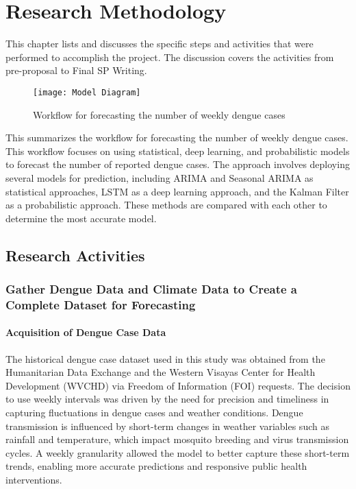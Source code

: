 \chapter{Research Methodology}
This chapter lists and discusses the specific steps and activities that  were  performed  to accomplish the project. 
The discussion covers the activities from pre-proposal to Final SP Writing.

\begin{figure}[ht]
	\centering
	\texttt{[image: Model Diagram]}
	\caption{Workflow for forecasting the number of weekly dengue cases}
	\label{fig:data_snippet}
\end{figure}
This summarizes the workflow for forecasting the number of weekly dengue cases. This workflow focuses on using statistical, deep learning, and probabilistic models to forecast the number of reported dengue cases. The approach involves deploying several models for prediction, including ARIMA and Seasonal ARIMA as statistical approaches, LSTM as a deep learning approach, and the Kalman Filter as a probabilistic approach. These methods are compared with each other to determine the most accurate model.
\section{Research Activities}

\subsection{Gather Dengue Data and Climate Data to Create a Complete Dataset for Forecasting}

\subsubsection{Acquisition of Dengue Case Data}
The historical dengue case dataset used in this study was obtained from the Humanitarian Data Exchange and the Western Visayas Center for Health Development (WVCHD) via Freedom of Information (FOI) requests. The decision to use weekly intervals was driven by the need for precision and timeliness in capturing fluctuations in dengue cases and weather conditions. Dengue transmission is influenced by short-term changes in weather variables such as rainfall and temperature, which impact mosquito breeding and virus transmission cycles. A weekly granularity allowed the model to better capture these short-term trends, enabling more accurate predictions and responsive public health interventions.

